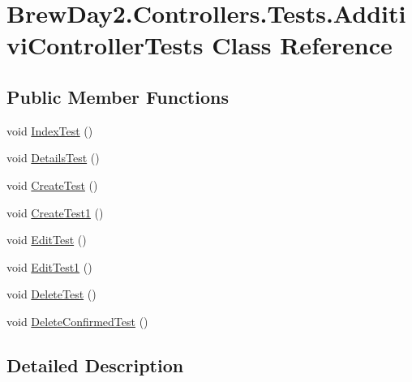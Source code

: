 \hypertarget{class_brew_day2_1_1_controllers_1_1_tests_1_1_additivi_controller_tests}{}\section{Brew\+Day2.\+Controllers.\+Tests.\+Additivi\+Controller\+Tests Class Reference}
\label{class_brew_day2_1_1_controllers_1_1_tests_1_1_additivi_controller_tests}
\subsection*{Public Member Functions}
\begin{DoxyCompactItemize}
\item 
void \mbox{\hyperlink{class_brew_day2_1_1_controllers_1_1_tests_1_1_additivi_controller_tests_adf5570aa3473a6971ec22245071b8964}{Index\+Test}} ()
\item 
void \mbox{\hyperlink{class_brew_day2_1_1_controllers_1_1_tests_1_1_additivi_controller_tests_ab3cf5d73f892de1a3ce83c9356c61853}{Details\+Test}} ()
\item 
void \mbox{\hyperlink{class_brew_day2_1_1_controllers_1_1_tests_1_1_additivi_controller_tests_ad8e5e067390e00738f17361426a3c02d}{Create\+Test}} ()
\item 
void \mbox{\hyperlink{class_brew_day2_1_1_controllers_1_1_tests_1_1_additivi_controller_tests_af7b36b529aa2429d0c2de9aa61f51cfd}{Create\+Test1}} ()
\item 
void \mbox{\hyperlink{class_brew_day2_1_1_controllers_1_1_tests_1_1_additivi_controller_tests_a0b3c0dfefd701333628c68461e4a1aa0}{Edit\+Test}} ()
\item 
void \mbox{\hyperlink{class_brew_day2_1_1_controllers_1_1_tests_1_1_additivi_controller_tests_a52a2ca6be9fa14f9e6af9d2123499f37}{Edit\+Test1}} ()
\item 
void \mbox{\hyperlink{class_brew_day2_1_1_controllers_1_1_tests_1_1_additivi_controller_tests_aec46557b50e6fbf013c5921600250732}{Delete\+Test}} ()
\item 
void \mbox{\hyperlink{class_brew_day2_1_1_controllers_1_1_tests_1_1_additivi_controller_tests_ade69e11a7705fbe1043655fe9b7c6a68}{Delete\+Confirmed\+Test}} ()
\end{DoxyCompactItemize}


\subsection{Detailed Description}


